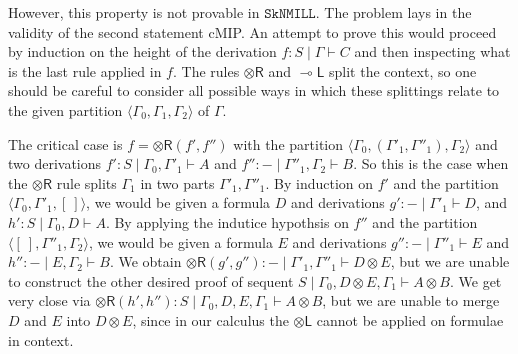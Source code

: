 \documentclass[sn-mathphys-num]{sn-jnl}%
\newcommand{\GG}{\Gamma}
\newcommand{\vd}{\vdash}
\newcommand{\tl}{\otimes \mathsf{L}}
\newcommand{\tr}{\otimes\mathsf{R}}
\newcommand{\ot}{\otimes}
\newcommand{\lolli}{\multimap}
\newcommand{\lleft}{{\lolli}\mathsf{L}}
\newcommand{\SkNMILL}{$\mathtt{SkNMILL}$}
\newcommand{\cMIP}{\textsf{cMIP}}
\theoremstyle{thmstyleone}%
\theoremstyle{thmstyletwo}%
\theoremstyle{thmstylethree}%
\begin{document}
However, this property is not provable in \SkNMILL. The problem lays in the validity of the second statement \cMIP. An attempt to prove this would proceed by induction on the height of the derivation $f : S \mid \Gamma \vdash C$ and then inspecting what is the last rule applied in $f$. The rules $\tr$ and $\lleft$ split the context, so one should be careful to consider all possible ways in which these splittings relate to the given partition $\langle \GG_0,\GG_1, \GG_2 \rangle$ of $\GG$.

The critical case is $f = \tr (f',f'')$ with the partition $\langle \GG_0, (\GG'_1, \GG''_1), \GG_2\rangle$ and two derivations $f' : S \mid \GG_0 , \GG'_1 \vd A$ and $f'' : {-} \mid \GG''_1 , \GG_2 \vd B$. So this is the case when the $\tr$ rule splits $\GG_1$ in two parts $\GG'_1,\GG''_1$.
By induction on $f'$ and the partition $\langle \GG_0 , \GG'_1, [\ ] \rangle$, we would be given a formula $D$ and derivations $g' : {-} \mid \GG'_1 \vd D$, and $h': S \mid \GG_0 , D \vd A$. By applying the indutice hypothsis on $f''$ and the partition $\langle [\ ], \GG''_1, \GG_2\rangle$, we would be given a formula $E$ and derivations $g'' : {-} \mid \GG''_1 \vd E$ and $h'': {-} \mid E, \GG_2 \vd B$.
We obtain $\tr (g',g'') : {-} \mid \GG'_1, \GG''_1 \vd D \ot E$, but we are unable to construct the other desired proof of sequent $S \mid \GG_0, D \ot E, \GG_1 \vd A \ot B$. We get very close via $\tr (h', h'') : S \mid \GG_0, D, E, \GG_1 \vd A \ot B$, but we are unable to merge $D$ and $E$ into $D \ot E$, since in our calculus the $\tl$ cannot be applied on formulae in context.
\end{document}
